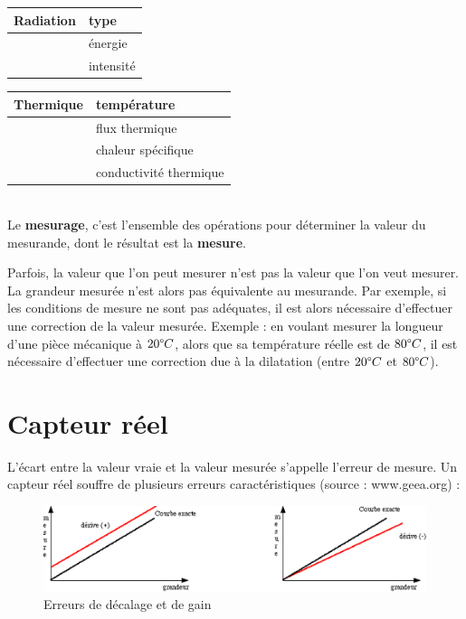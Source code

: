 \documentclass[main.tex]{subfiles}
\begin{document}
\begin {center}
\begin{tabular}{|p{3cm}|p{7cm}|}
    Radiation & type      \\
    \hline
              & énergie   \\
    \hline
              & intensité \\
    \hline
\end{tabular}
\begin{tabular}{|p{3cm}|p{7cm}|}
    Thermique & température            \\
    \hline
              & flux thermique         \\
    \hline
              & chaleur spécifique     \\
    \hline
              & conductivité thermique \\
    \hline
\end{tabular}
\end{center}
~\\

Le \textbf{mesurage}, c'est l'ensemble des opérations pour déterminer la valeur du mesurande, dont le résultat est la \textbf{mesure}.

Parfois, la valeur que l'on peut mesurer n'est pas la valeur que l'on veut mesurer. La grandeur mesurée n'est alors pas équivalente au mesurande. Par exemple, si les conditions de mesure ne sont pas adéquates, il est alors nécessaire d'effectuer une correction de la valeur mesurée. Exemple : en voulant mesurer la longueur d'une pièce mécanique à $20 \degree C$, alors que sa température réelle est de $80 \degree C$, il est nécessaire d'effectuer une correction due à la dilatation (entre $20 \degree C$ et $80 \degree C$).

\section{Capteur réel}
L'écart entre la valeur vraie et la valeur mesurée s'appelle l'erreur de mesure. Un capteur réel souffre de plusieurs erreurs caractéristiques (source : www.geea.org) :

\begin{figure}[h!]
    \centering
    \includegraphics[width=\textwidth]{assets/figures/4_1_8_Erreurs_de_decalage_et_de_gain.PNG}
    \caption{Erreurs de décalage et de gain}
    \label{fig:Erreurs_de_decalage_et_de_gain}
\end{figure}
\end{document}
